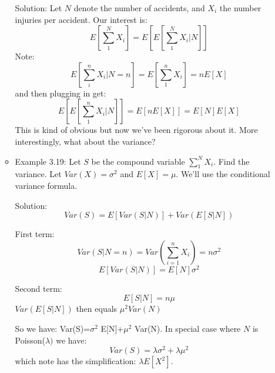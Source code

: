 \documentclass[10pt,containsverbatim,paralist]{article}
\begin{document}
\begin{itemize}
\begin{itemize}
Solution:
Let $N$ denote the number of accidents, and $X_i$ the number injuries per
accident.  Our interest is: $$E[\sum_1^N X_i]=E[E[\sum_1^N X_i|N]]$$
Note: $$E[\sum_i^n X_i|N=n]=E[\sum_1^n X_i] = nE[X]$$ and then plugging in
get: $$E[E[\sum_1^n X_i|N]]=E[nE[X]]=E[N]E[X]$$
This is kind of obvious but now we've been rigorous about it.  More
interestingly, what about the variance?


\item Example 3.19: Let $S$ be the compound variable $\sum_1^N X_i$.  Find the variance.  Let $Var(X)=\sigma^2$ and $E[X]=\mu$.  We'll use the conditional variance formula.
\label{sec-1-1-7-3-1-2}

Solution:
$$Var(S)=E[Var(S|N)]+Var(E[S|N])$$

First term: 
$$Var(S|N=n)=Var(\sum_{i=1}^n X_i)=n\sigma^2$$
$$E[Var(S|N)]=E[N]\sigma^2$$

Second term:
$$E[S|N]=n\mu$$
$Var(E[S|N])$ then equals $\mu^2 Var(N)$

So we have: Var(S)=$\sigma$$^{\text{2}}$ E[N]+$\mu$$^{\text{2}}$ Var(N).
In special case where $N$ is Poisson($\lambda)$ we
have:$$Var(S)=\lambda\sigma^2+\lambda \mu^2$$ which note has the
simplification: $\lambda E[X^2]$.

\end{itemize}
\end{itemize}
\end{document}
